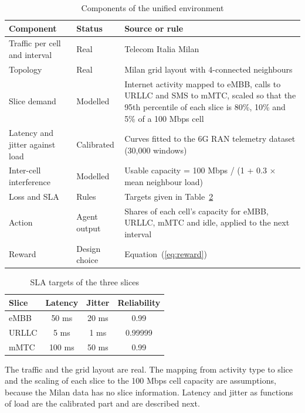 \begin{table}[h]
\centering
\caption{Components of the unified environment}
\label{tab:env}
\small
\begin{tabular}{|p{3.4cm}|p{2.2cm}|p{9.6cm}|}
\hline
\textbf{Component} & \textbf{Status} & \textbf{Source or rule} \\ \hline
Traffic per cell and interval & Real & Telecom Italia Milan \\ \hline
Topology & Real & Milan grid layout with 4-connected neighbours \\ \hline
Slice demand & Modelled & Internet activity mapped to eMBB, calls to URLLC and SMS to mMTC, scaled so that the 95th percentile of each slice is 80\%, 10\% and 5\% of a 100 Mbps cell \\ \hline
Latency and jitter against load & Calibrated & Curves fitted to the 6G RAN telemetry dataset (30,000 windows) \\ \hline
Inter-cell interference & Modelled & Usable capacity = 100 Mbps / (1 + 0.3 $\times$ mean neighbour load) \\ \hline
Loss and SLA & Rules & Targets given in Table~\ref{tab:sla} \\ \hline
Action & Agent output & Shares of each cell's capacity for eMBB, URLLC, mMTC and idle, applied to the next interval \\ \hline
Reward & Design choice & Equation~(\ref{eq:reward}) \\ \hline
\end{tabular}
\end{table}

\begin{table}[h]
\centering
\caption{SLA targets of the three slices}
\label{tab:sla}
\small
\begin{tabular}{|l|c|c|c|}
\hline
\textbf{Slice} & \textbf{Latency} & \textbf{Jitter} & \textbf{Reliability} \\ \hline
eMBB  & 50 ms  & 20 ms & 0.99 \\ \hline
URLLC & 5 ms   & 1 ms  & 0.99999 \\ \hline
mMTC  & 100 ms & 50 ms & 0.99 \\ \hline
\end{tabular}
\end{table}


The traffic and the grid layout are real. The mapping from activity type to slice and the scaling of each slice to the 100 Mbps cell capacity are assumptions, because the Milan data has no slice information. Latency and jitter as functions of load are the calibrated part and are described next.

